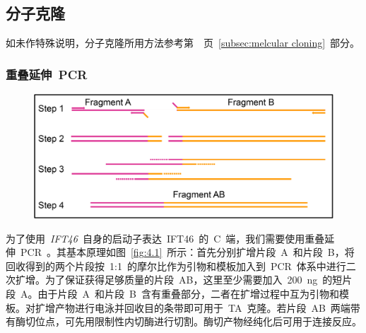 \subsection{分子克隆}\label{subsec:melcular cloning second}
如未作特殊说明，分子克隆所用方法参考第\ \pageref{subsec:melcular cloning}\ 页\
\ref{subsec:melcular cloning}\ 部分。

\subsubsection{重叠延伸\ PCR}\label{subsec:SOEPCR}
\begin{figure}[!ht]
\centering
\graphicspath{{figures/}}
\includegraphics[width=\textwidth]{fig4-1.jpg}
{
\par}
\end{figure}
为了使用\ \textit{IFT46}\ 自身的启动子表达\ IFT46\ 的\ C\ 端，我们需要使用重叠延伸\ PCR\ \citep{Quan2011,Quan2009,Bryksin2010}。其基本原理如图\ \ref{fig:4.1}\ 所示：首先分别扩增片段\ A\ 和片段\ B，将回收得到的两个片段按\ 1:1\ 的摩尔比作为引物和模板加入到\ PCR\ 体系中进行二次扩增。为了保证获得足够质量的片段\ AB，这里至少需要加入\ \SI{200}{\ng}\ 的短片段\ A。由于片段\ A\ 和片段\ B\ 含有重叠部分，二者在扩增过程中互为引物和模板。对扩增产物进行电泳并回收目的条带即可用于\ TA\ 克隆。若片段\ AB\ 两端带有酶切位点，可先用限制性内切酶进行切割。酶切产物经纯化后可用于连接反应。

